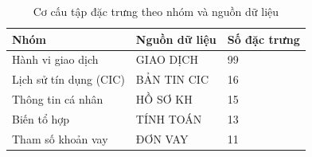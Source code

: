 \begin{table}[!htbp]
\centering
\caption{Cơ cấu tập đặc trưng theo nhóm và nguồn dữ liệu}
\label{tab:feature-groups}
\small
\setlength{\tabcolsep}{5.0pt}
\begin{tabular}{@{}L{4.2cm}L{4.2cm}R{3.0cm}@{}}
\toprule
\textbf{Nhóm} & \textbf{Nguồn dữ liệu} & \textbf{Số đặc trưng} \\
\midrule
Hành vi giao dịch & GIAO DỊCH & 99 \\
Lịch sử tín dụng (CIC) & BẢN TIN CIC & 16 \\
Thông tin cá nhân & HỒ SƠ KH & 15 \\
Biến tổ hợp & TÍNH TOÁN & 13 \\
Tham số khoản vay & ĐƠN VAY & 11 \\
\bottomrule
\end{tabular}
\end{table}

